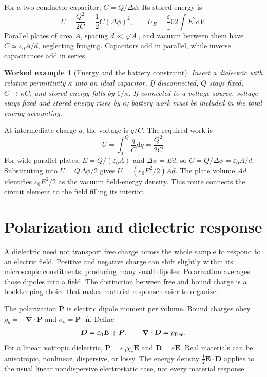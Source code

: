 \documentclass[11pt,oneside]{book}
\newcommand{\dd}{\mathrm{d}}
\newcommand{\vect}[1]{\boldsymbol{#1}}
\newcommand{\grad}{\boldsymbol{\nabla}}
\newcommand{\eps}{\varepsilon_0}
\theoremstyle{reviewstyle}
\newtheorem{example}{Worked example}[chapter]
\begin{document}
For a two-conductor capacitor, $C=Q/\Delta\phi$. Its stored energy is
\begin{equation}U=\frac{Q^2}{2C}=\frac12C(\Delta\phi)^2,\qquad U_E=\frac\eps2\int E^2\dd V.\end{equation}
Parallel plates of area $A$, spacing $d\ll\sqrt A$, and vacuum between them have $C\simeq\eps A/d$, neglecting fringing. Capacitors add in parallel, while inverse capacitances add in series.
\begin{example}[Energy and the battery constraint]
Insert a dielectric with relative permittivity $\kappa$ into an ideal capacitor. If disconnected, $Q$ stays fixed, $C\to\kappa C$, and stored energy falls by $1/\kappa$. If connected to a voltage source, voltage stays fixed and stored energy rises by $\kappa$; battery work must be included in the total energy accounting.
\end{example}

At intermediate charge $q$, the voltage is $q/C$. The required work is
\begin{equation}
U=\int_0^Q\frac qC\dd q=\frac{Q^2}{2C}.
\end{equation}
For wide parallel plates, $E=Q/(\eps A)$ and $\Delta\phi=Ed$, so $C=Q/\Delta\phi=\eps A/d$. Substituting into $U=Q\Delta\phi/2$ gives $U=(\eps E^2/2)Ad$. The plate volume $Ad$ identifies $\eps E^2/2$ as the vacuum field-energy density. This route connects the circuit element to the field filling its interior.

\section{Polarization and dielectric response}
A dielectric need not transport free charge across the whole sample to respond to an electric field. Positive and negative charge can shift slightly within its microscopic constituents, producing many small dipoles. Polarization averages those dipoles into a field. The distinction between free and bound charge is a bookkeeping choice that makes material response easier to organize.

The polarization $\vect P$ is electric dipole moment per volume. Bound charges obey $\rho_b=-\grad\cdot\vect P$ and $\sigma_b=\vect P\cdot\hat{\vect n}$. Define
\begin{equation}\vect D=\eps\vect E+\vect P,\qquad \grad\cdot\vect D=\rho_{\rm free}.\end{equation}
For a linear isotropic dielectric, $\vect P=\eps\chi_e\vect E$ and $\vect D=\varepsilon\vect E$. Real materials can be anisotropic, nonlinear, dispersive, or lossy. The energy density $\tfrac12\vect E\cdot\vect D$ applies to the usual linear nondispersive electrostatic case, not every material response.
\end{document}
